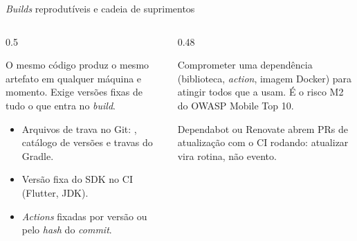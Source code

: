 \documentclass[aspectratio=169,10pt]{beamer}
\begin{document}
\begin{frame}{\emph{Builds} reprodutíveis e cadeia de suprimentos}
  \begin{columns}[T]
    \begin{column}{0.5\textwidth}
      \begin{definicao}
        O mesmo código produz o mesmo artefato em qualquer máquina e momento. Exige versões fixas de tudo o que entra no \emph{build}.
      \end{definicao}
      \begin{conceito}
        \begin{itemize}
          \item Arquivos de trava no Git: , catálogo de versões e travas do Gradle.
          \item Versão fixa do SDK no CI (Flutter, JDK).
          \item \emph{Actions} fixadas por versão ou pelo \emph{hash} do \emph{commit}.
        \end{itemize}
      \end{conceito}
    \end{column}
    \begin{column}{0.48\textwidth}
      \begin{definicao}
        Comprometer uma dependência (biblioteca, \emph{action}, imagem Docker) para atingir todos que a usam. É o risco M2 do OWASP Mobile Top 10.
      \end{definicao}
      \begin{dica}
        Dependabot ou Renovate abrem PRs de atualização com o CI rodando: atualizar vira rotina, não evento.
      \end{dica}
    \end{column}
  \end{columns}
\end{frame}
\end{document}
